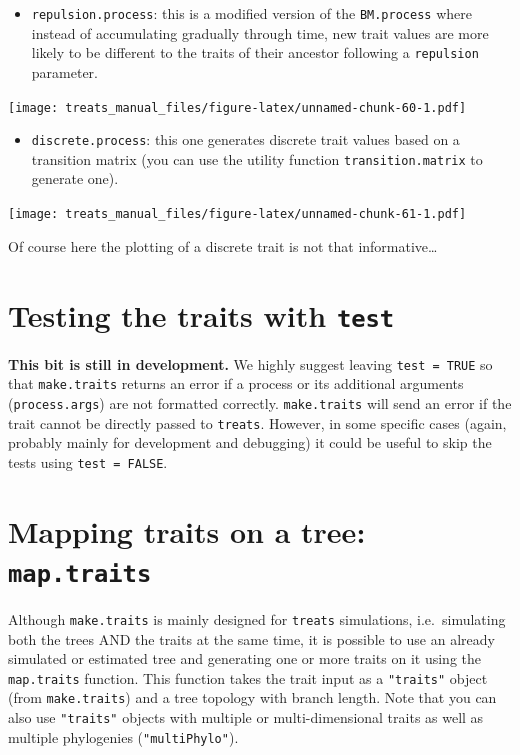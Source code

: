 \documentclass[
]{book}
\providecommand{\tightlist}{%
  \setlength{\itemsep}{0pt}\setlength{\parskip}{0pt}}
\begin{document}
\begin{itemize}
\tightlist
\item
  \texttt{repulsion.process}: this is a modified version of the \texttt{BM.process} where instead of accumulating gradually through time, new trait values are more likely to be different to the traits of their ancestor following a \texttt{repulsion} parameter.
\end{itemize}

\texttt{[image: treats\_manual\_files/figure-latex/unnamed-chunk-60-1.pdf]}

\begin{itemize}
\tightlist
\item
  \texttt{discrete.process}: this one generates discrete trait values based on a transition matrix (you can use the utility function \texttt{transition.matrix} to generate one).
\end{itemize}

\texttt{[image: treats\_manual\_files/figure-latex/unnamed-chunk-61-1.pdf]}

Of course here the plotting of a discrete trait is not that informative\ldots{}

\hypertarget{testing-the-traits-with-test}{%
\section{\texorpdfstring{Testing the traits with \texttt{test}}{Testing the traits with test}}\label{testing-the-traits-with-test}}

\textbf{This bit is still in development.}
We highly suggest leaving \texttt{test\ =\ TRUE} so that \texttt{make.traits} returns an error if a process or its additional arguments (\texttt{process.args}) are not formatted correctly.
\texttt{make.traits} will send an error if the trait cannot be directly passed to \texttt{treats}.
However, in some specific cases (again, probably mainly for development and debugging) it could be useful to skip the tests using \texttt{test\ =\ FALSE}.

\hypertarget{mapping-traits-on-a-tree-map.traits}{%
\section{\texorpdfstring{Mapping traits on a tree: \texttt{map.traits}}{Mapping traits on a tree: map.traits}}\label{mapping-traits-on-a-tree-map.traits}}

Although \texttt{make.traits} is mainly designed for \texttt{treats} simulations, i.e.~simulating both the trees AND the traits at the same time, it is possible to use an already simulated or estimated tree and generating one or more traits on it using the \texttt{map.traits} function. This function takes the trait input as a \texttt{"traits"} object (from \texttt{make.traits}) and a tree topology with branch length. Note that you can also use \texttt{"traits"} objects with multiple or multi-dimensional traits as well as multiple phylogenies (\texttt{"multiPhylo"}).
\end{document}
